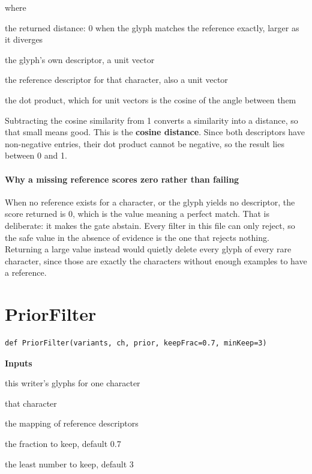 \noindent where
\begin{description}[leftmargin=2.4em,style=nextline,font=\normalfont\ttfamily]\setlength\itemsep{1pt}
  \item[{$D$}] \normalfont the returned distance: 0 when the glyph matches the reference exactly, larger as it diverges
  \item[{$\mathbf{v}$}] \normalfont the glyph's own descriptor, a unit vector
  \item[{$\mathbf{p}_c$}] \normalfont the reference descriptor for that character, also a unit vector
  \item[{$\cdot$}] \normalfont the dot product, which for unit vectors is the cosine of the angle between them
\end{description}
Subtracting the cosine similarity from 1 converts a similarity into a distance, so that small means good. This is the \textbf{cosine distance}. Since both descriptors have non-negative entries, their dot product cannot be negative, so the result lies between 0 and 1.


\paragraph{Why a missing reference scores zero rather than failing}
When no reference exists for a character, or the glyph yields no descriptor, the score returned is 0, which is the value meaning a perfect match. That is deliberate: it makes the gate abstain. Every filter in this file can only reject, so the safe value in the absence of evidence is the one that rejects nothing. Returning a large value instead would quietly delete every glyph of every rare character, since those are exactly the characters without enough examples to have a reference.


\section{PriorFilter}
\begin{lstlisting}[style=sig]
def PriorFilter(variants, ch, prior, keepFrac=0.7, minKeep=3)
\end{lstlisting}

\noindent\textbf{Inputs}
\begin{description}[leftmargin=2.2em,style=nextline,font=\normalfont\ttfamily]\setlength\itemsep{1pt}
  \item[{variants}] \normalfont this writer's glyphs for one character
  \item[{ch}] \normalfont that character
  \item[{prior}] \normalfont the mapping of reference descriptors
  \item[{keepFrac}] \normalfont the fraction to keep, default 0.7
  \item[{minKeep}] \normalfont the least number to keep, default 3
\end{description}

